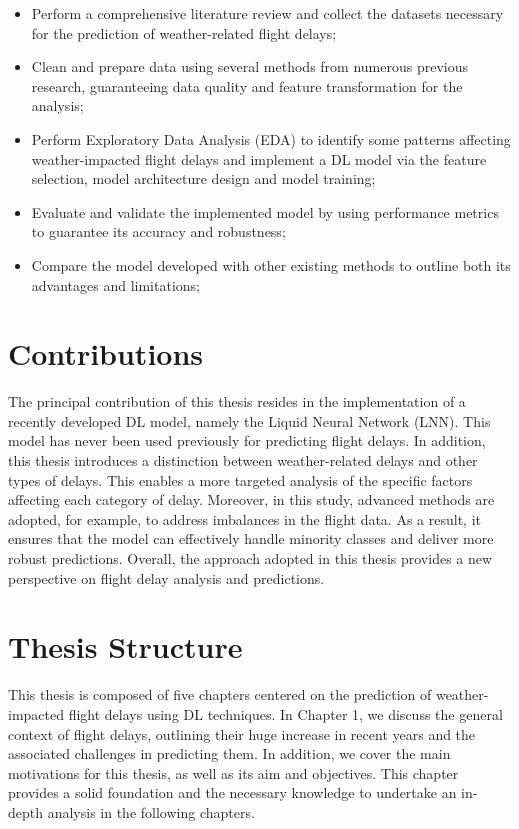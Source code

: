 \documentclass[12pt,oneside]{book} %
\begin{document}
\begin{itemize}
    \item  Perform a comprehensive literature review and collect the datasets necessary for the prediction of weather-related flight delays;
    \item Clean and prepare data using several methods from numerous previous research, guaranteeing data quality and feature transformation for the analysis;
    \item Perform Exploratory Data Analysis (EDA) to identify some patterns affecting weather-impacted flight delays and implement a DL model via the feature selection, model architecture design and model training;
    \item Evaluate and validate the implemented model by using performance metrics to guarantee its accuracy and robustness;
    \item Compare the model developed with other existing methods to outline both its advantages and limitations;
\end{itemize}

\section{Contributions}

\noindent The principal contribution of this thesis resides in the implementation of a recently developed DL model, namely the Liquid Neural Network (LNN). This model has never been used previously for predicting flight delays. In addition, this thesis introduces a distinction between weather-related delays and other types of delays. This enables a more targeted analysis of the specific factors affecting each category of delay. Moreover, in this study, advanced methods are adopted, for example, to address imbalances in the flight data. As a result, it ensures that the model can effectively handle minority classes and deliver more robust predictions. Overall, the approach adopted in this thesis provides a new perspective on flight delay analysis and predictions.

\section{Thesis Structure}


\noindent This thesis is composed of five chapters centered on the prediction of weather-impacted flight delays using DL techniques. In Chapter 1, we discuss the general context of flight delays, outlining their huge increase in recent years and the associated challenges in predicting them. In addition, we cover the main motivations for this thesis, as well as its aim and objectives. This chapter provides a solid foundation and the necessary knowledge to undertake an in-depth analysis in the following chapters.
\end{document}
